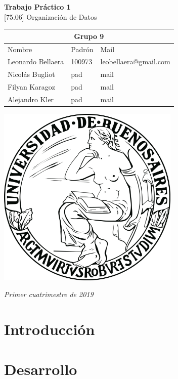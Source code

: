 \documentclass[titlepage,a4paper]{article}
\begin{document}
\begin{titlepage} %
    \centering
    \vfill
    \Huge \textbf{Trabajo Práctico 1} \\
    
    \vskip1cm
    \Huge [75.06] Organización de Datos\\
    \vskip2cm
    \begin{table}[htbp]
	\begin{center}
	\begin{adjustbox}{max width=\textwidth}
	\begin{tabular}{|l|l|l|}
	\hline
    \multicolumn{3}{|c|}{Grupo 9} \\ \hline
	Nombre & Padrón & Mail \\ \hline 
    Leonardo Bellaera & 100973 & leobellaera@gmail.com \\ \hline 
    Nicolás Bugliot & pad  & mail \\ \hline
    Filyan Karagoz &  pad & mail \\ \hline
    Alejandro Kler &  pad & mail \\ \hline
    \end{tabular}
    \end{adjustbox}
    \vskip 2cm
    \includegraphics[width=8.7cm, height=8.7cm]{UBA.png}
	\label{tabla:sencilla}
	\end{center}
	\end{table}
	\vskip1cm
	\Large \textit{Primer cuatrimestre de 2019}

    \vfill
\end{titlepage}
\tableofcontents %
\newpage

\section{Introducción}\label{sec:intro}


\section{Desarrollo}\label{sec:intro}


\subsection{}
\end{document}
